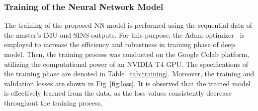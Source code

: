 \documentclass[3p]{elsarticle}
\begin{document}
\subsubsection{Training of the Neural Network Model}
\noindent The training of the proposed NN model is performed using the sequential data of the master's IMU and SINS outputs.
For this purpose, the Adam optimizer~\cite{kingma2014adam} is employed to increase the efficiency and robustness in training phase of deep model.
Then, the training process was conducted on the Google Colab platform, utilizing the computational power of an NVIDIA T4 GPU\@.
The specifications of the training phase are denoted in Table~\ref{tab:training}.
 Moreover, the training and validation losses are shown in Fig~\ref{fig:loss}.
 It is observed that the trained model is effectively learned from the data, as the loss values consistently decrease throughout the training process.

\end{document}
